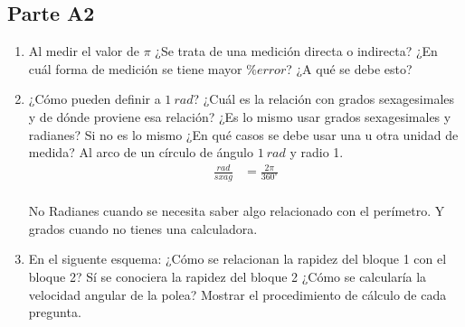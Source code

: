 \subsection{Parte A2}%
\label{sub:cues_parte_a2}

\begin{enumerate}
	\item Al medir el valor de $\pi$
		¿Se trata de una medición directa o indirecta?
		¿En cuál forma de medición se tiene mayor $\% error$?
		¿A qué se debe esto?
	\item ¿Cómo pueden definir a $1\ rad$?
		¿Cuál es la relación con grados sexagesimales y de dónde proviene esa relación?
		¿Es lo mismo usar grados sexagesimales y radianes?
		Si no es lo mismo
		¿En qué casos se debe usar una u otra unidad de medida?
		\subitem Al arco de un círculo de ángulo $1\ rad$ y radio 1.
		\subitem
		\begin{align*}
			\frac{rad}{sxag} &= \frac{2\pi}{360^\circ} \\
		\end{align*}
		\begin{figure}[H]
			\centering
			
		\end{figure}
		\subitem No
		\subitem Radianes cuando se necesita saber algo relacionado con el perímetro.
		\subitem Y grados cuando no tienes una calculadora.
	\item En el siguente esquema:
		¿Cómo se relacionan la rapidez del bloque 1 con el bloque 2?
		Sí se conociera la rapidez del bloque 2
		¿Cómo se calcularía la velocidad angular de la polea?
		Mostrar el procedimiento de cálculo de cada pregunta.
		\begin{figure}[H]
			\centering
			
		\end{figure}
\end{enumerate}
